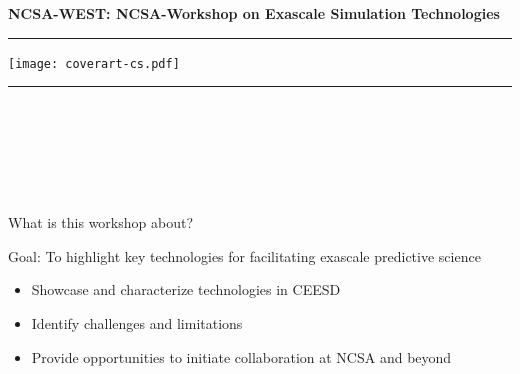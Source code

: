 \documentclass[aspectratio=169]{beamer}
\begin{document}
\begin{frame}\frametitle{}

\vspace*{0.2in}

\hspace*{0.0in}\textrm{{\huge\bfseries\color{myOrange} NCSA-WEST: NCSA-Workshop on Exascale Simulation Technologies}}

\vspace*{0.2in}
\hrule
\begin{center}
\texttt{[image: coverart-cs.pdf]}
\end{center}
\hrule

\vspace*{0.1in}
\ \hbox{}\hfill{} \\
\ \hbox{}\hfill{} \\
\ \hbox{}\hfill{} \\
\ \hbox{}\hfill{} \\
\ \hbox{}\hfill{} \\

\end{frame}

\begin{frame}{What is this workshop about?}
\begin{center}
Goal: To highlight key technologies for facilitating exascale predictive science
\end{center}
\begin{itemize}
\item Showcase and characterize technologies in CEESD
\item Identify challenges and limitations
\item Provide opportunities to initiate collaboration at NCSA and beyond
\end{itemize}
\end{frame}
\end{document}
